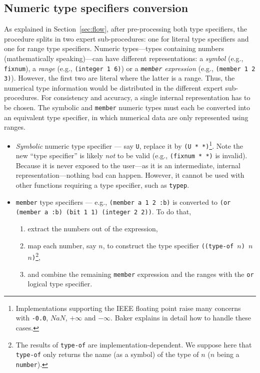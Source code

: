 \documentclass[format=sigconf]{acmart}
\newcommand\code[2][\small]{\sloppy\texttt{#1#2}}
\newcommand\footcode[1]{\code[\scriptsize]{#1}}
\theoremstyle{definition}
\begin{document}
\subsection{Numeric type specifiers conversion}
\label{sec:numconv}
As explained in Section~\ref{sec:flow}, after pre-processing both type
specifiers, the procedure splits in two expert sub-procedures: one for literal
type specifiers and one for range type specifiers.
Numeric types---types containing numbers (mathematically speaking)---can have
different representations: a \emph{symbol} (e.g., \code{fixnum}), a \emph{range}
(e.g., \code{(integer 1 6)}) or a \emph{\code{member} expression}
(e.g., \code{(member 1 2 3)}). However, the first two are literal where the
latter is a range. Thus, the numerical type information would be distributed in
the different expert sub-procedures. For consistency and accuracy, a single internal
representation has to be chosen. The symbolic and \code{member} numeric types
must each be converted into an equivalent type specifier, in which numerical
data are only represented using ranges.

\begin{itemize}
\item \emph{Symbolic} numeric type specifier --- say \code{U}, replace it by
  \code{(U * *)}\footnote{%
    Implementations supporting the IEEE floating point
    raise many concerns with \footcode{-0.0}, $NaN$, $+\infty$ and $-\infty$.
    Baker explains in detail how to handle these cases.%
  }. Note the new ``type specifier'' is likely
  \emph{not} to be valid (e.g., \code{(fixnum * *)} is invalid). Because it is
  never exposed to the user---as it is an intermediate, internal
  representation---nothing bad can happen. However, it cannot be used with other
  functions requiring a type specifier, such as \code{typep}.
\item \code{member} type specifiers --- e.g., \code{(member a 1 2 :b)} is
  converted to \code{(or (member a :b) (bit 1 1) (integer 2 2))}.
  To do that,
  \begin{enumerate}
  \item extract the numbers out of the expression,
  \item map each number, say $n$, to construct the type specifier
    \code{((type-of $n$) $n$ $n$)}\footnote{%
      The results of \footcode{type-of} are implementation-dependent. We suppose
      here that \footcode{type-of} only returns the name (as a symbol) of the
      type of $n$ ($n$ being a \footcode{number}).
    },
  \item and combine the remaining \code{member} expression and the ranges with
    the \code{or} logical type specifier.
  \end{enumerate}
\end{itemize}
\end{document}
